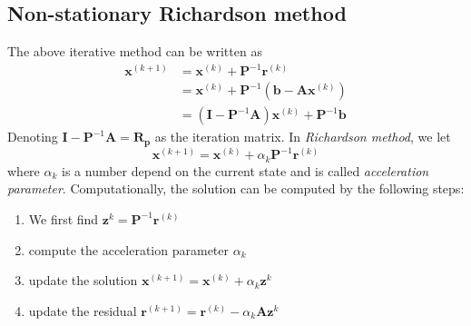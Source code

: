 \documentclass{article}
\begin{document}
\subsection{Non-stationary Richardson method}
The above iterative method can be written as 
\begin{align*}
    \mathbf{x}^{(k+1)} &= \mathbf{x}^{(k)} + \mathbf{P}^{-1}\mathbf{r}^{(k)} \\
    &= \mathbf{x}^{(k)} + \mathbf{P}^{-1} \left(\mathbf{b} - \mathbf{A}\mathbf{x}^{(k)} \right) \\
    &= \left( \mathbf{I} - \mathbf{P}^{-1}\mathbf{A}  \right) \mathbf{x}^{(k)} + \mathbf{P}^{-1} \mathbf{b} 
\end{align*}
Denoting $\mathbf{I} - \mathbf{P}^{-1}\mathbf{A} = \mathbf{R_p}$ as the 
iteration matrix. 
In \emph{Richardson method}, we let
\begin{equation}
    \mathbf{x}^{(k+1)} = \mathbf{x}^{(k)} + \alpha_k \mathbf{P}^{-1}\mathbf{r}^{(k)}
\end{equation}
where $\alpha_k$ is a number depend on the current state and is 
called \emph{acceleration parameter}. Computationally, the solution can be computed 
by the following steps:
\begin{enumerate}
    \item We first find $\mathbf{z}^{k} = \mathbf{P}^{-1}\mathbf{r}^{(k)}$
    \item compute the acceleration parameter $\alpha_k$
    \item update the solution $\mathbf{x}^{(k+1)} = \mathbf{x}^{(k)} + \alpha_k \mathbf{z}^{k}$
    \item update the residual $\mathbf{r}^{(k+1)} = \mathbf{r}^{(k)} - \alpha_k \mathbf{A} \mathbf{z}^{k}$ 
\end{enumerate}
\end{document}
